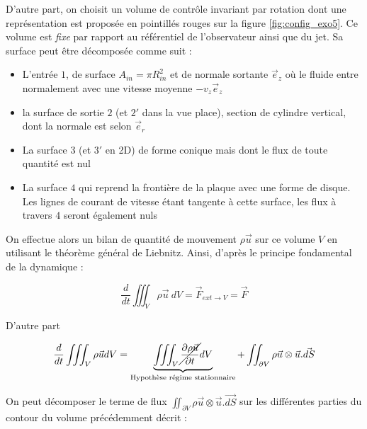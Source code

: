 D'autre part, on choisit un volume de contrôle invariant par rotation dont une représentation est proposée en pointillés rouges sur la figure \ref{fig:config_exo5}. Ce volume est \emph{fixe} par rapport au référentiel de l'observateur ainsi que du jet. Sa surface peut être décomposée comme suit :
\begin{itemize}
    \item L'entrée $1$, de surface $A_{in} = \pi R_{in}^2$ et de normale sortante $\vec{e}_z$ où le fluide entre normalement avec une vitesse moyenne $-v_z \vec{e}_z$
    \item la surface de sortie $2$ (et $2'$ dans la vue place), section de cylindre vertical, dont la normale est selon $\vec{e}_r$
    \item La surface $3$ (et $3'$ en 2D) de forme conique mais dont le flux de toute quantité est nul
    \item La surface $4$ qui reprend la frontière de la plaque avec une forme de disque. Les lignes de courant de vitesse étant tangente à cette surface, les flux à travers $4$ seront également nuls
\end{itemize}

\medskip

On effectue alors un bilan de quantité de mouvement $\rho \vec{u}$ sur ce volume $V$ en utilisant le théorème général de Liebnitz. Ainsi, d'après le principe fondamental de la dynamique :

\begin{equation}
    \frac{d}{dt} \iiint_V \rho \vec{u} ~ dV = \vec{F}_{ext \rightarrow V} = \vec{F}
\end{equation}


D'autre part

\begin{equation}
    \frac{d}{dt} \iiint_V \rho \vec{u} dV = \underbrace{\iiint_V \cancel{\frac{\partial \rho \vec{u}}{\partial t}}dV}_{\textnormal{Hypothèse régime stationnaire}} + \iint_{\partial V} \rho \vec{u} \otimes \vec{u}.\vec{dS} 
\end{equation}

On peut décomposer le terme de flux $\iint_{\partial V} \rho \vec{u} \otimes \vec{u}.\vec{dS}$ sur les différentes parties du contour du volume précédemment décrit :

